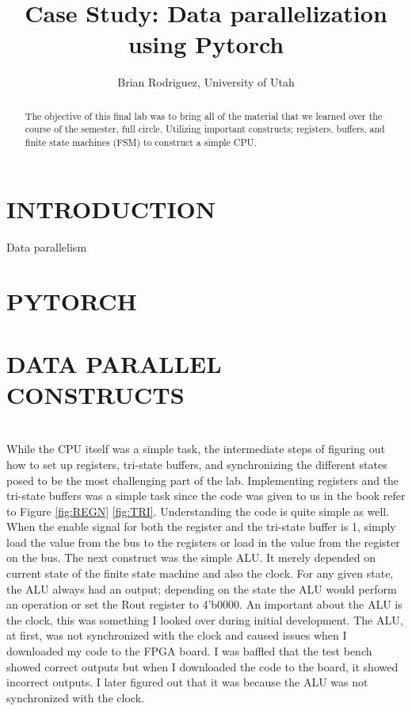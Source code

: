 \documentclass[10pt,conference]{ieeeconf}
\begin{document}
\title{Case Study: Data parallelization using Pytorch}
\author{Brian Rodriguez, University of Utah}
\maketitle

\begin{abstract}
	The objective of this final lab was to bring all of the material that we learned over the course of the semester, full circle. Utilizing important constructs; registers, buffers, and finite state machines (FSM) to construct a simple CPU.
\end{abstract}

\section{INTRODUCTION}
	Data parallelism 

\section{PYTORCH}
\section{DATA PARALLEL CONSTRUCTS}
\section{}
	While the CPU itself was a simple task, the intermediate steps of figuring out how to set up registers, tri-state buffers, and synchronizing the different states posed to be the most challenging part of the lab. Implementing registers and the tri-state buffers was a simple task since the code was given to us in the book refer to Figure \ref{fig:REGN} \ref{fig:TRI}. Understanding the code is quite simple as well. When the enable signal for both the register and the tri-state buffer is 1, simply load the value from the bus to the registers or load in the value from the register on the bus. The next construct was the simple ALU. It merely depended on current state of the finite state machine and also the clock. For any given state, the ALU always had an output; depending on the state the ALU would perform an operation or set the Rout register to 4'b0000. An important about the ALU is the clock, this was something I looked over during initial development. The ALU, at first, was not synchronized with the clock and caused issues when I downloaded my code to the FPGA board. I was baffled that the test bench showed correct outputs but when I downloaded the code to the board, it showed incorrect outputs. I later figured out that it was because the ALU was not synchronized with the clock.
\end{document}
